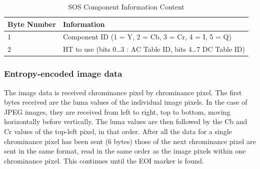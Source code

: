 \begin{table}[!hbtp]
	\caption{SOS Component Information Content}
	\centering
	\begin{tabular}{ | p{2cm} | p{4cm} | }
	\hline
	\textbf{Byte Number} &  \textbf{Information} \\ \hline
	1 & Component ID (1 = Y, 2 = Cb, 3 = Cr, 4 = I, 5 = Q)\\ \hline
	2 & HT to use (bits 0\ldots3 : AC Table ID, bits 4\ldots7 DC Table ID)\\ \hline
	\end{tabular}
\end{table}

\subsubsection{Entropy-encoded image data}

The image data is received chrominance pixel by chrominance pixel. 
The first bytes received are the luma values of the individual image pixels. 
In the case of JPEG images, they are received from left to right, top to bottom, moving horizontally before vertically. 
The luma values are then followed by the Cb and Cr values of the top-left pixel, in that order. 
After all the data for a single chrominance pixel has been sent (6 bytes) those of the next chrominance pixel are sent in the same format, 
read in the same order as the image pixels within one chrominance pixel. This continues until the EOI marker is found.
